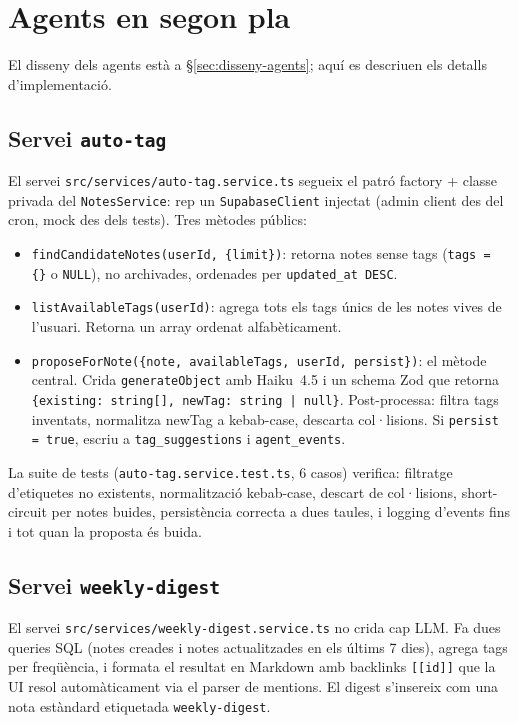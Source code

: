 \section{Agents en segon pla}
\label{sec:impl-agents}

El disseny dels agents està a \S\ref{sec:disseny-agents}; aquí es descriuen els detalls d'implementació.

\subsection{Servei \texttt{auto-tag}}

El servei \texttt{src/services/auto-tag.service.ts} segueix el patró factory + classe privada del \texttt{NotesService}: rep un \texttt{SupabaseClient} injectat (admin client des del cron, mock des dels tests). Tres mètodes públics:

\begin{itemize}
    \item \texttt{findCandidateNotes(userId, \{limit\})}: retorna notes sense tags (\texttt{tags = \{\}} o \texttt{NULL}), no archivades, ordenades per \texttt{updated\_at DESC}.
    \item \texttt{listAvailableTags(userId)}: agrega tots els tags únics de les notes vives de l'usuari. Retorna un array ordenat alfabèticament.
    \item \texttt{proposeForNote(\{note, availableTags, userId, persist\})}: el mètode central. Crida \texttt{generateObject} amb Haiku~4.5 i un schema Zod que retorna \texttt{\{existing: string[], newTag: string | null\}}. Post-processa: filtra tags inventats, normalitza newTag a kebab-case, descarta col·lisions. Si \texttt{persist = true}, escriu a \texttt{tag\_suggestions} i \texttt{agent\_events}.
\end{itemize}

La suite de tests (\texttt{auto-tag.service.test.ts}, 6 casos) verifica: filtratge d'etiquetes no existents, normalització kebab-case, descart de col·lisions, short-circuit per notes buides, persistència correcta a dues taules, i logging d'events fins i tot quan la proposta és buida.

\subsection{Servei \texttt{weekly-digest}}

El servei \texttt{src/services/weekly-digest.service.ts} no crida cap LLM. Fa dues queries SQL (notes creades i notes actualitzades en els últims 7 dies), agrega tags per freqüència, i formata el resultat en Markdown amb backlinks \texttt{[[id]]} que la UI resol automàticament via el parser de mentions. El digest s'insereix com una nota estàndard etiquetada \texttt{weekly-digest}.

